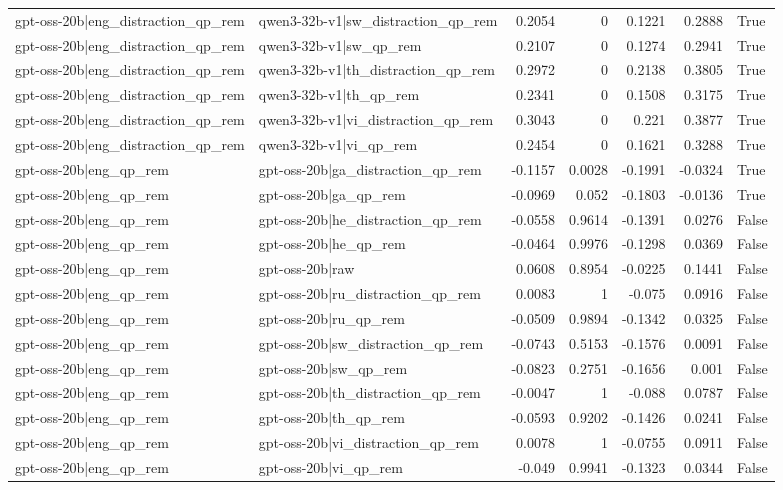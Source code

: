 \begin{table}
\begin{tabular}{l l r r r r l}
gpt-oss-20b|eng_distraction_qp_rem & qwen3-32b-v1|sw_distraction_qp_rem & 0.2054 & 0 & 0.1221 & 0.2888 & True \\
gpt-oss-20b|eng_distraction_qp_rem & qwen3-32b-v1|sw_qp_rem & 0.2107 & 0 & 0.1274 & 0.2941 & True \\
gpt-oss-20b|eng_distraction_qp_rem & qwen3-32b-v1|th_distraction_qp_rem & 0.2972 & 0 & 0.2138 & 0.3805 & True \\
gpt-oss-20b|eng_distraction_qp_rem & qwen3-32b-v1|th_qp_rem & 0.2341 & 0 & 0.1508 & 0.3175 & True \\
gpt-oss-20b|eng_distraction_qp_rem & qwen3-32b-v1|vi_distraction_qp_rem & 0.3043 & 0 & 0.221 & 0.3877 & True \\
gpt-oss-20b|eng_distraction_qp_rem & qwen3-32b-v1|vi_qp_rem & 0.2454 & 0 & 0.1621 & 0.3288 & True \\
gpt-oss-20b|eng_qp_rem & gpt-oss-20b|ga_distraction_qp_rem & -0.1157 & 0.0028 & -0.1991 & -0.0324 & True \\
gpt-oss-20b|eng_qp_rem & gpt-oss-20b|ga_qp_rem & -0.0969 & 0.052 & -0.1803 & -0.0136 & True \\
gpt-oss-20b|eng_qp_rem & gpt-oss-20b|he_distraction_qp_rem & -0.0558 & 0.9614 & -0.1391 & 0.0276 & False \\
gpt-oss-20b|eng_qp_rem & gpt-oss-20b|he_qp_rem & -0.0464 & 0.9976 & -0.1298 & 0.0369 & False \\
gpt-oss-20b|eng_qp_rem & gpt-oss-20b|raw & 0.0608 & 0.8954 & -0.0225 & 0.1441 & False \\
gpt-oss-20b|eng_qp_rem & gpt-oss-20b|ru_distraction_qp_rem & 0.0083 & 1 & -0.075 & 0.0916 & False \\
gpt-oss-20b|eng_qp_rem & gpt-oss-20b|ru_qp_rem & -0.0509 & 0.9894 & -0.1342 & 0.0325 & False \\
gpt-oss-20b|eng_qp_rem & gpt-oss-20b|sw_distraction_qp_rem & -0.0743 & 0.5153 & -0.1576 & 0.0091 & False \\
gpt-oss-20b|eng_qp_rem & gpt-oss-20b|sw_qp_rem & -0.0823 & 0.2751 & -0.1656 & 0.001 & False \\
gpt-oss-20b|eng_qp_rem & gpt-oss-20b|th_distraction_qp_rem & -0.0047 & 1 & -0.088 & 0.0787 & False \\
gpt-oss-20b|eng_qp_rem & gpt-oss-20b|th_qp_rem & -0.0593 & 0.9202 & -0.1426 & 0.0241 & False \\
gpt-oss-20b|eng_qp_rem & gpt-oss-20b|vi_distraction_qp_rem & 0.0078 & 1 & -0.0755 & 0.0911 & False \\
gpt-oss-20b|eng_qp_rem & gpt-oss-20b|vi_qp_rem & -0.049 & 0.9941 & -0.1323 & 0.0344 & False \\

\end{tabular}
\end{table}
